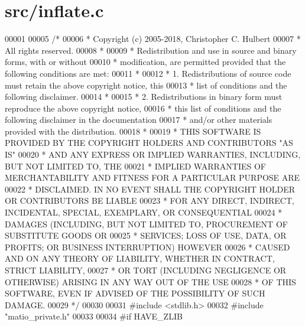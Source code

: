 \hypertarget{src_2inflate_8c_source}{}\section{src/inflate.c}
\label{src_2inflate_8c_source}

\begin{DoxyCode}
00001 
00005 \textcolor{comment}{/*}
00006 \textcolor{comment}{ * Copyright (c) 2005-2018, Christopher C. Hulbert}
00007 \textcolor{comment}{ * All rights reserved.}
00008 \textcolor{comment}{ *}
00009 \textcolor{comment}{ * Redistribution and use in source and binary forms, with or without}
00010 \textcolor{comment}{ * modification, are permitted provided that the following conditions are met:}
00011 \textcolor{comment}{ *}
00012 \textcolor{comment}{ * 1. Redistributions of source code must retain the above copyright notice, this}
00013 \textcolor{comment}{ *    list of conditions and the following disclaimer.}
00014 \textcolor{comment}{ *}
00015 \textcolor{comment}{ * 2. Redistributions in binary form must reproduce the above copyright notice,}
00016 \textcolor{comment}{ *    this list of conditions and the following disclaimer in the documentation}
00017 \textcolor{comment}{ *    and/or other materials provided with the distribution.}
00018 \textcolor{comment}{ *}
00019 \textcolor{comment}{ * THIS SOFTWARE IS PROVIDED BY THE COPYRIGHT HOLDERS AND CONTRIBUTORS "AS IS"}
00020 \textcolor{comment}{ * AND ANY EXPRESS OR IMPLIED WARRANTIES, INCLUDING, BUT NOT LIMITED TO, THE}
00021 \textcolor{comment}{ * IMPLIED WARRANTIES OF MERCHANTABILITY AND FITNESS FOR A PARTICULAR PURPOSE ARE}
00022 \textcolor{comment}{ * DISCLAIMED. IN NO EVENT SHALL THE COPYRIGHT HOLDER OR CONTRIBUTORS BE LIABLE}
00023 \textcolor{comment}{ * FOR ANY DIRECT, INDIRECT, INCIDENTAL, SPECIAL, EXEMPLARY, OR CONSEQUENTIAL}
00024 \textcolor{comment}{ * DAMAGES (INCLUDING, BUT NOT LIMITED TO, PROCUREMENT OF SUBSTITUTE GOODS OR}
00025 \textcolor{comment}{ * SERVICES; LOSS OF USE, DATA, OR PROFITS; OR BUSINESS INTERRUPTION) HOWEVER}
00026 \textcolor{comment}{ * CAUSED AND ON ANY THEORY OF LIABILITY, WHETHER IN CONTRACT, STRICT LIABILITY,}
00027 \textcolor{comment}{ * OR TORT (INCLUDING NEGLIGENCE OR OTHERWISE) ARISING IN ANY WAY OUT OF THE USE}
00028 \textcolor{comment}{ * OF THIS SOFTWARE, EVEN IF ADVISED OF THE POSSIBILITY OF SUCH DAMAGE.}
00029 \textcolor{comment}{ */}
00030 
00031 \textcolor{preprocessor}{#include <stdlib.h>}
00032 \textcolor{preprocessor}{#include "matio\_private.h"}
00033 
00034 \textcolor{preprocessor}{#if HAVE\_ZLIB}

\end{DoxyCode}
